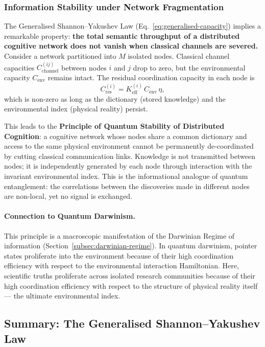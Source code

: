 \documentclass[12pt,a4paper]{article}
\theoremstyle{remark}
\begin{document}
	\subsubsection{Information Stability under Network Fragmentation}
	\label{subsubsec:info-stability-fragmentation}
	
	The Generalised Shannon--Yakushev Law (Eq.~\ref{eq:generalised-capacity})
	implies a remarkable property: \textbf{the total semantic throughput of a
		distributed cognitive network does not vanish when classical channels are
		severed.} Consider a network partitioned into \(M\) isolated nodes.
	Classical channel capacities \(C_{\mathrm{channel}}^{(ij)}\) between nodes
	\(i\) and \(j\) drop to zero, but the environmental capacity
	\(C_{\mathrm{env}}\) remains intact. The residual coordination capacity
	in each node is
	\[
	C_{\mathrm{res}}^{(i)} = K_{\mathrm{eff}}^{(i)} \, C_{\mathrm{env}} \, \eta,
	\]
	which is non-zero as long as the dictionary (stored knowledge) and the
	environmental index (physical reality) persist.
	
	This leads to the \textbf{Principle of Quantum Stability of Distributed
		Cognition}: a cognitive network whose nodes share a common dictionary and
	access to the same physical environment cannot be permanently
	de-coordinated by cutting classical communication links. Knowledge is not
	transmitted between nodes; it is independently generated by each node
	through interaction with the invariant environmental index. This is the
	informational analogue of quantum entanglement: the correlations between
	the discoveries made in different nodes are non-local, yet no signal is
	exchanged.
	
	\paragraph{Connection to Quantum Darwinism.}
	This principle is a macroscopic manifestation of the Darwinian Regime of
	information (Section~\ref{subsec:darwinian-regime}). In quantum
	darwinism, pointer states proliferate into the environment because of
	their high coordination efficiency with respect to the environmental
	interaction Hamiltonian. Here, scientific truths proliferate across
	isolated research communities because of their high coordination
	efficiency with respect to the structure of physical reality itself ---
	the ultimate environmental index.
	
	\subsection{Summary: The Generalised Shannon--Yakushev Law}
	\label{subsec:generalised-law}
	
\end{document}
